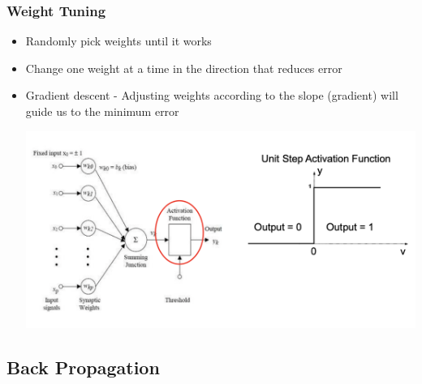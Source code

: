 \documentclass[11pt]{article}
\begin{document}
\subsubsection{Weight Tuning}
\begin{itemize}
\item Randomly pick weights until it works 
\item Change one weight at a time in the direction that reduces error
\item Gradient descent - Adjusting weights according to the slope (gradient) will guide us to the minimum error
\begin{center}
\includegraphics[scale=0.4]{images/artneuron.png}
\end{center}
\end{itemize}


\subsection{Back Propagation}
\end{document}
